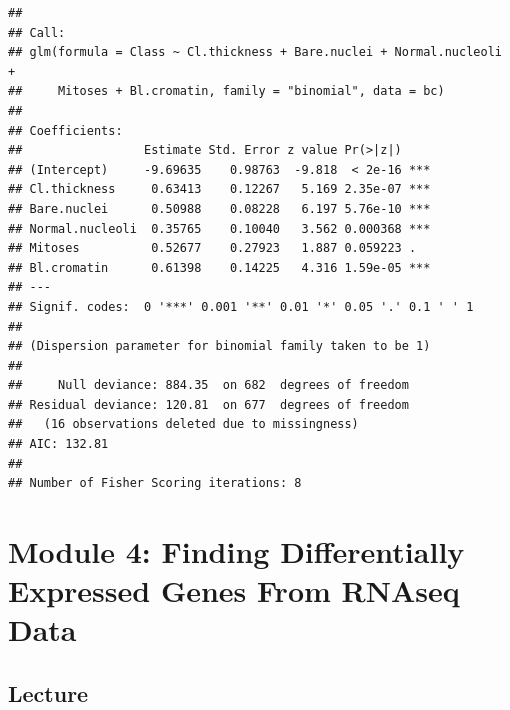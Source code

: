 \documentclass[
]{book}
\begin{document}
\begin{verbatim}
## 
## Call:
## glm(formula = Class ~ Cl.thickness + Bare.nuclei + Normal.nucleoli + 
##     Mitoses + Bl.cromatin, family = "binomial", data = bc)
## 
## Coefficients:
##                 Estimate Std. Error z value Pr(>|z|)    
## (Intercept)     -9.69635    0.98763  -9.818  < 2e-16 ***
## Cl.thickness     0.63413    0.12267   5.169 2.35e-07 ***
## Bare.nuclei      0.50988    0.08228   6.197 5.76e-10 ***
## Normal.nucleoli  0.35765    0.10040   3.562 0.000368 ***
## Mitoses          0.52677    0.27923   1.887 0.059223 .  
## Bl.cromatin      0.61398    0.14225   4.316 1.59e-05 ***
## ---
## Signif. codes:  0 '***' 0.001 '**' 0.01 '*' 0.05 '.' 0.1 ' ' 1
## 
## (Dispersion parameter for binomial family taken to be 1)
## 
##     Null deviance: 884.35  on 682  degrees of freedom
## Residual deviance: 120.81  on 677  degrees of freedom
##   (16 observations deleted due to missingness)
## AIC: 132.81
## 
## Number of Fisher Scoring iterations: 8
\end{verbatim}

\chapter{Module 4: Finding Differentially Expressed Genes From RNAseq Data}\label{module-4-finding-differentially-expressed-genes-from-rnaseq-data}

\section{Lecture}\label{lecture-3}
\end{document}
